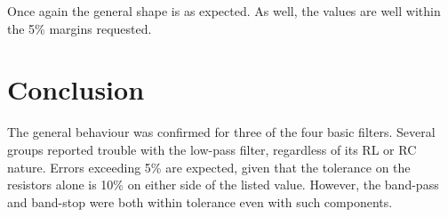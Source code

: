 \documentclass[journal]{IEEEtran}
\begin{document}
Once again the general shape is as expected. As well, the values are well within the 5\% margins requested.

\section{Conclusion}

The general behaviour was confirmed for three of the four basic filters. Several groups reported trouble with the low-pass filter, regardless of its RL or RC nature. Errors exceeding 5\% are expected, given that the tolerance on the resistors alone is 10\% on either side of the listed value. However, the band-pass and band-stop were both within tolerance even with such components.
\end{document}
